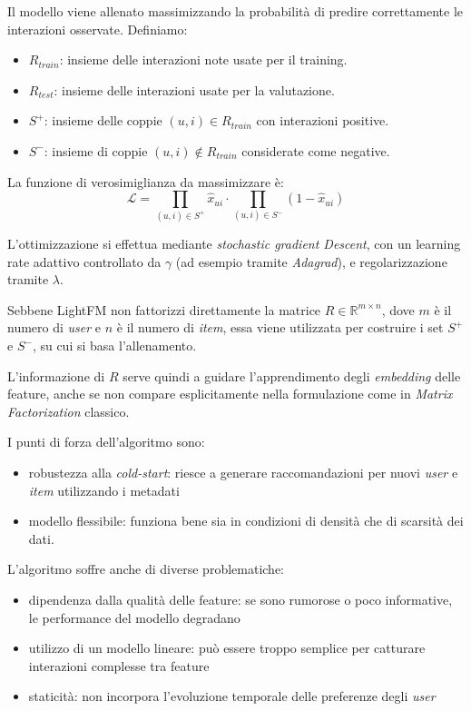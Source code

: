 Il modello viene allenato massimizzando la probabilità di predire correttamente le interazioni osservate. Definiamo:

\begin{itemize}
    \item $R_{train}$: insieme delle interazioni note usate per il training.
    \item $R_{test}$: insieme delle interazioni usate per la valutazione.
    \item $S^+$: insieme delle coppie $(u, i) \in R_{train}$ con interazioni positive.
    \item $S^-$: insieme di coppie $(u, i) \notin R_{train}$ considerate come negative.
\end{itemize}

La funzione di verosimiglianza da massimizzare è:
\[
\mathcal{L} = \prod_{(u,i) \in S^+} \hat{x}_{ui} \cdot \prod_{(u,i) \in S^-} (1 - \hat{x}_{ui})
\]

L'ottimizzazione si effettua mediante \textit{stochastic gradient Descent}, con un learning rate adattivo controllato da $\gamma$ (ad esempio tramite \textit{Adagrad}), e regolarizzazione tramite $\lambda$.

Sebbene LightFM non fattorizzi direttamente la matrice $R \in \mathbb{R}^{m \times n}$, dove $m$ è il numero di \textit{user} e $n$ è il numero di \textit{item}, essa viene utilizzata per costruire i set $S^+$ e $S^-$, su cui si basa l'allenamento.

L'informazione di $R$ serve quindi a guidare l'apprendimento degli \textit{embedding} delle feature, anche se non compare esplicitamente nella formulazione come in \textit{Matrix Factorization} classico.

I punti di forza dell'algoritmo sono:

\begin{itemize}
    \item robustezza alla \textit{cold-start}: riesce a generare raccomandazioni per nuovi \textit{user} e \textit{item} utilizzando i metadati
    \item modello flessibile: funziona bene sia in condizioni di densità che di scarsità dei dati.
\end{itemize}

L'algoritmo soffre anche di diverse problematiche:

\begin{itemize}
    \item dipendenza dalla qualità delle feature: se sono rumorose o poco informative, le performance del modello degradano
    \item utilizzo di un modello lineare: può essere troppo semplice per catturare interazioni complesse tra feature
    \item staticità: non incorpora l'evoluzione temporale delle preferenze degli \textit{user}
\end{itemize}

